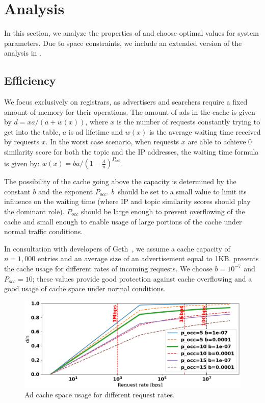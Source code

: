 
\section{Analysis}
\label{sec:analysis}

In this section, we analyze the properties of \sysname and choose optimal values for system parameters. 
Due to space constraints, we include an extended version of the analysis in .

\subsection{Efficiency}

We focus exclusively on registrars, as advertisers and searchers require a fixed amount of memory for their operations. The amount of ads in the cache is given by $d = xa/(a + w(x))$, where $x$ is the number of requests constantly trying to get into the table, $a$ is ad lifetime and $w(x)$ is the average waiting time received by requests $x$.
In the worst case scenario, when requests $x$ are able to achieve 0 similarity score for both the topic and the IP addresses, the waiting time formula is given by: $w(x) = ba/(1 - \frac{d}{n})^{P_\textit{occ}}$.

The possibility of the cache going above the capacity is determined by the constant $b$ and the exponent $P_\textit{occ}$. $b$~should be set to a small value to limit its influence on the waiting time (where IP and topic similarity scores should play the dominant role). $P_\textit{occ}$ should be large enough to prevent overflowing of the cache and small enough to enable usage of large portions of the cache under normal traffic conditions. 

In consultation with developers of Geth~\cite{geth}, we assume a cache capacity of $n = 1,000$ entries and an average size of an advertisement equal to 1KB.
 presents the cache usage for different rates of incoming requests.
We choose $b=10^{-7}$ and $P_\textit{occ}=10$; these values provide good protection against cache overflowing and a good usage of cache space under normal conditions. 

\begin{figure}[t]
    \includegraphics[width=1\linewidth]{img/cache_size_limit}
    \vspace{-0.10in}
    \caption{Ad cache space usage for different request rates.
    }
    \label{fig:cache_size_limit}
    \vspace{-0.15in}
\end{figure}

